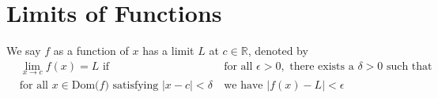 \section{Limits of Functions}

\begin{definition}
We say $f$ as a function of $x$ has a limit $L$ at $c \in \mathbb{R}$, denoted by
\begin{align*}
    &\lim_{x \longrightarrow c} f(x) = L \hspace{4pt} \text{if} \hspace{20pt} &&\text{for all} \hspace{4pt} \epsilon > 0, \hspace{4pt} \text{there exists a} \hspace{4pt} \delta > 0 \hspace{4pt} \text{such that}\\[2ex]
    &\text{for all} \hspace{4pt} x \in \text{Dom($f$)} \hspace{4pt} \text{satisfying} \hspace{4pt} \lvert x - c \rvert < \delta &&\text{we have} \hspace{4pt} \lvert f(x) - L \rvert < \epsilon
\end{align*}
\end{definition}

